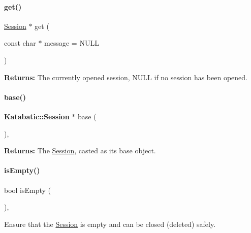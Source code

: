 \paragraph{\texorpdfstring{get()}{get()}}
{\footnotesize\ttfamily \hyperlink{classKite_1_1Session}{Session} $\ast$ get (\begin{DoxyParamCaption}\item[{const char $\ast$}]{message = {\ttfamily NULL} }\end{DoxyParamCaption})\hspace{0.3cm}{\ttfamily [static]}}

{\bfseries Returns\+:} The currently opened session, {\ttfamily N\+U\+LL} if no session has been opened. \mbox{\label{classKite_1_1Session_a8a3fc782c34dc075bb2e14209e245494}} 
\paragraph{\texorpdfstring{base()}{base()}}
{\footnotesize\ttfamily \textbf{ Katabatic\+::\+Session} $\ast$ base (\begin{DoxyParamCaption}{ }\end{DoxyParamCaption})\hspace{0.3cm}{\ttfamily [inline]}, {\ttfamily [static]}}

{\bfseries Returns\+:} The \hyperlink{classKite_1_1Session}{Session}, casted as it\textquotesingle{}s base object. \mbox{\label{classKite_1_1Session_af337ffd75e4f019ce15302c60715d84b}} 
\paragraph{\texorpdfstring{is\+Empty()}{isEmpty()}}
{\footnotesize\ttfamily bool is\+Empty (\begin{DoxyParamCaption}{ }\end{DoxyParamCaption})\hspace{0.3cm}{\ttfamily [inline]}, {\ttfamily [static]}}

Ensure that the \hyperlink{classKite_1_1Session}{Session} is empty and can be closed (deleted) safely. \mbox{\label{classKite_1_1Session_a7b6c91acd2c2a7c082b3b006c1bdc91d}} 
